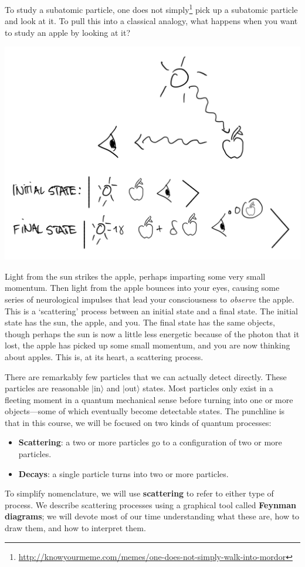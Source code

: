 \documentclass[12pt]{article}
\numberwithin{equation}{section}    %
\theoremstyle{definition}
\begin{document}
 To study a subatomic particle, one does not simply\footnote{\url{http://knowyourmeme.com/memes/one-does-not-simply-walk-into-mordor}} pick up a subatomic particle and look at it. To pull this into a classical analogy, what happens when you want to study an apple by looking at it?
\begin{center}
\includegraphics[width=.7\textwidth]{Lec1_lp_applescatter}	
\end{center}
Light from the sun strikes the apple, perhaps imparting some very small momentum. Then light from the apple bounces into your eyes, causing some series of neurological impulses that lead your consciousness to \emph{observe} the apple. This is a `scattering' process between an initial state and a final state. The initial state has the sun, the apple, and you. The final state has the same objects, though perhaps the sun is now a little less energetic because of the photon that it lost, the apple has picked up some small momentum, and you are now thinking about apples. This is, at its heart, a scattering process.

There are remarkably few particles that we can actually detect directly. These particles are reasonable $|\text{in}\rangle$ and $|\text{out}\rangle$ states. Most particles only exist in a fleeting moment in a quantum mechanical sense before turning into one or more objects---some of which eventually become detectable states. 
%
The punchline is that in this course, we will be focused on two kinds of quantum processes:
\begin{itemize}
	\item \textbf{Scattering}: a two or more particles go to a configuration of two or more particles.
	\item \textbf{Decays}: a single particle turns into two or more particles.
\end{itemize}
To simplify nomenclature, we will use \textbf{scattering} to refer to either type of process. We describe scattering processes using a graphical tool called \textbf{Feynman diagrams}; we will devote most of our time understanding what these are, how to draw them, and how to interpret them. 
\end{document}
